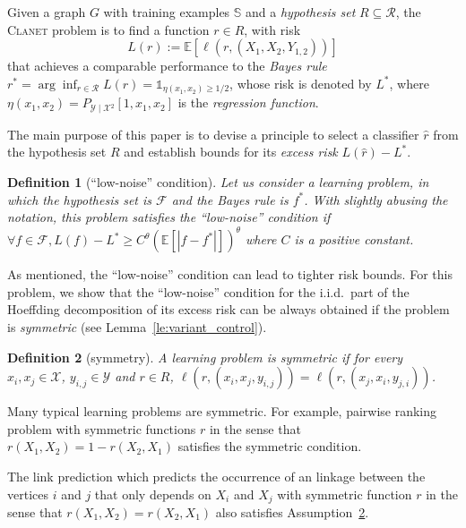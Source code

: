 \documentclass[letterpaper]{article} %
\def\LongVersion{}
\def\LongVersionEnd{}
\newtheorem{definition}{Definition}
\newcommand{\E}{\mathbb{E}}
\newcommand{\indicator}{\mathds 1}
\newcommand{\xspace}{\mathcal{X}}
\newcommand{\yspace}{\mathcal{Y}}
\newcommand{\bayeserror}{L^*}
\newcommand{\risk}{L}
\newcommand{\lossf}{\ell}
\newcommand{\problemabbr}{\textnormal{C}\textsc{lanet}}
\newcommand{\trainingset}{\mathbb{S}}
\begin{document}
Given a graph $G$ with training examples $\trainingset$ and a \emph{hypothesis set}  $R\subseteq\mathcal{R}$, the \problemabbr{} problem is to find a function $r\in R$, with risk
\begin{equation}
    \label{eq:graph_reconstruction_risk}
    \risk(r) := \E[\ell(r, (X_1,X_2,Y_{1,2}))]
\end{equation}
that achieves a comparable performance to the \emph{Bayes rule} $r^*=\arg\inf_{r\in\mathcal{R}}\risk(r) = \indicator_{\eta(x_1,x_2)\ge 1/2}$, whose risk is denoted by $\bayeserror{}$, where $\eta(x_1,x_2)=P_{\yspace{}\mid\xspace{}^2}[1,x_1,x_2]$ is the \emph{regression function}. 

The main purpose of this paper is to devise a principle to select a classifier $\hat{r}$ from the hypothesis set $R$ and establish bounds for its \emph{excess risk} $\risk(\hat{r}) - \bayeserror{}$.
\begin{definition}[``low-noise'' condition]
  \label{de:low-noise condition}
  Let us consider a learning problem, in which the hypothesis set is $\mathcal{F}$ and the Bayes rule is $f^*$. With slightly abusing the notation, this problem satisfies the ``low-noise'' condition if $\forall f\in \mathcal{F}, \risk{}(f) - \bayeserror{}\ge C^\theta(\E[|f-f^*|])^\theta$ where $C$ is a positive constant.
\end{definition}
As mentioned, the ``low-noise'' condition can lead to tighter risk bounds.
For this problem, we show that the ``low-noise'' condition for the i.i.d.\ part of the Hoeffding decomposition \cite{hoeffding1948class} of its excess risk can be always obtained if the problem is \emph{symmetric} (see Lemma~\ref{le:variant_control}).
\begin{definition}[symmetry]
    \label{con:symmetric}
    A learning problem is symmetric if for every $x_i,x_j\in \xspace{}$, $y_{i,j}\in \yspace{}$ and $r\in R$, $\lossf(r, (x_i,x_j,y_{i,j})) = \lossf(r, (x_j,x_i,y_{j,i}))$.
\end{definition}
Many typical learning problems are symmetric.
For example, pairwise ranking problem with symmetric functions $r$ in the sense that $r(X_1,X_2)=1-r(X_2,X_1)$ satisfies the symmetric condition. 
\LongVersion
The link prediction which predicts the occurrence of an linkage between the vertices $i$ and $j$ that only depends on $X_i$ and $X_j$ with symmetric function $r$ in the sense that $r(X_1,X_2)=r(X_2,X_1)$ also satisfies Assumption~\ref{con:symmetric}.
\LongVersionEnd

\end{document}
